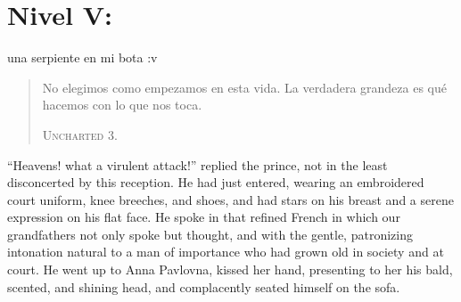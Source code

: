 \chapter*{Nivel V: } 

 una serpiente en mi bota :v 

\begin{quote} \calli No elegimos como empezamos en esta vida. La verdadera grandeza es qué hacemos con lo que nos toca. 

\textsc{Uncharted 3.}
\end{quote}

``Heavens! what a virulent attack!'' replied the prince, not in
the least disconcerted by this reception. He had just entered,
wearing an embroidered court uniform, knee breeches, and shoes,
and had stars on his breast and a serene expression on his flat
face. He spoke in that refined French in which our grandfathers
not only spoke but thought, and with the gentle, patronizing
intonation natural to a man of importance who had grown old in
society and at court. He went up to Anna Pavlovna, kissed her
hand, presenting to her his bald, scented, and shining head, and
complacently seated himself on the sofa.



